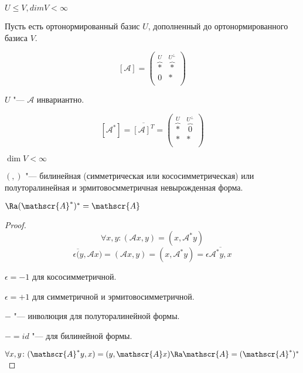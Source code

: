 \begin{exmp}
$U \le V, dim V < \infty$

Пусть есть ортонормированный базис $U$, дополненный до ортонормированного базиса $V$.


$$[\mathscr{A}] = \begin{pmatrix}
 \overbrace{*}^U & \overbrace{*}^{U^{\bot}} \\
 0 & * \\
 \end{pmatrix}$$

$U$ "--- $\mathscr{A}$ инвариантно.  

$$ 
[\mathscr{A}^{*}] = \overline{[\mathscr{A}]^T} = 
\begin{pmatrix}
\overbrace{*}^U& \overbrace{0}^{U^{\bot}}\\
*& *\\
\end{pmatrix}
$$
\end{exmp}

\begin{theorem}{}
$\dim V < \infty$

$(,)$ "--- билинейная (симметрическая или кососимметрическая) или полуторалинейная и эрмитовосмметричная невырожденная форма. 

$\Ra (\mathscr{A}^*)^* = \mathscr{A}$
\end{theorem}

\begin{proof}
$$\forall x, y \colon (\mathscr{A}x, y) = (x, \mathscr{A}^* y) $$
$$\epsilon \overline(y, \mathscr{A} x) = (\mathscr{A}x, y) = (x, \mathscr{A}^* y) = \epsilon \overline{\mathscr{A}^*y, x}$$

$\epsilon = -1$ для кососимметричной. 

$\epsilon = +1$ для симметричной и эрмитовосимметричной. 

$-$ "--- инволюция для полуторалинейной формы. 

$- = id$ "--- для билинейной формы. 

$\forall x, y \colon (\mathscr{A}^{*}y, x) = (y, \mathscr{A}x) \Ra \mathscr{A} = (\mathscr{A}^*)^*$
\end{proof}
